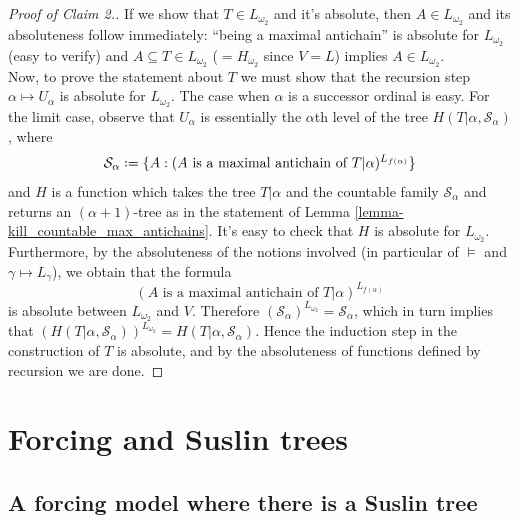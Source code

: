 \documentclass[11pt,a4paper]{report}
\theoremstyle{definition}
\theoremstyle{num.custom-title}
\theoremstyle{custom-title}
\DeclareMathOperator{\sse}{\subseteq}
\newcommand*{\defeq}{\mathrel{\rlap{%
                     \raisebox{0.3ex}{$\cdot$}}%
                     \raisebox{-0.3ex}{$\cdot$}}%
                     =}
\renewcommand{\S}{\mathcal{S}}
\begin{document}
\begin{proof}[Proof of Claim 2.]
\renewcommand{\qedsymbol}{$\blacksquare$}
If we show that $T \in L_{\omega_2}$ and it's absolute, then $A \in L_{\omega_2}$ and its absoluteness follow immediately: ``being a maximal antichain'' is absolute for $L_{\omega_2}$ (easy to verify) and $A \sse T \in L_{\omega_2}$ ($= H_{\omega_2}$ since $V=L$) implies $A \in L_{\omega_2}$.\\
Now, to prove the statement about $T$ we must show that the recursion step $\alpha \mapsto U_\alpha$ is absolute for $L_{\omega_2}$. The case when $\alpha$ is a successor ordinal is easy. For the limit case, observe that $U_\alpha$ is essentially the $\alpha$th level of the tree $H(T|\alpha, \S_\alpha)$, where 
\[
\S_\alpha \defeq \{A : (A \text{ is a maximal antichain of } T|\alpha)^{L_{f(\alpha)}}\}
\]
and $H$ is a function which takes the tree $T|\alpha$ and the countable family $\S_\alpha$ and returns an $(\alpha+1)$-tree as in the statement of Lemma \ref{lemma-kill_countable_max_antichains}. It's easy to check that $H$ is absolute for $L_{\omega_2}$. Furthermore, by the absoluteness of the notions involved (in particular of $\models$ and $\gamma \mapsto L_\gamma$), we obtain that the formula
\[
(A \text{ is a maximal antichain of } T|\alpha)^{L_{f(\alpha)}}
\]
is absolute between $L_{\omega_2}$ and $V$. Therefore $(\S_\alpha)^{L_{\omega_2}} = \S_\alpha$, which in turn implies that $(H(T|\alpha, \S_\alpha))^{L_{\omega_2}} = H(T|\alpha, \S_\alpha)$. Hence the induction step in the construction of $T$ is absolute, and by the absoluteness of functions defined by recursion we are done.
\end{proof}


\section{Forcing and Suslin trees}

\subsection{A forcing model where there is a Suslin tree}
\end{document}
